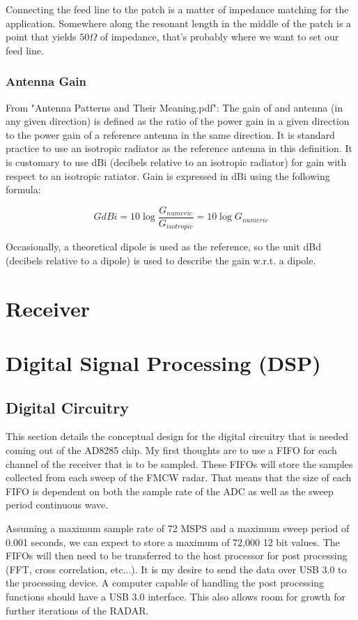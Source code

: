 \documentclass[]{article}
\begin{document}
Connecting the feed line to the patch is a matter of impedance matching for the application. Somewhere along the resonant length in the middle of the patch is a point that yields $ 50 \Omega $ of impedance, that's probably where we want to set our feed line.

\subsubsection{Antenna Gain}
From "Antenna Patterns and Their Meaning.pdf":
The gain of and antenna (in any given direction) is defined as the ratio of the power gain in a given direction to the power gain of a reference antenna in the same direction. It is standard practice to use an isotropic radiator as the reference antenna in this definition. It is customary to use dBi (decibels relative to an isotropic radiator) for gain with respect to an isotropic ratiator. Gain is expressed in dBi using the following formula:

\begin{equation}
GdBi = 10 \log{ \frac{G_{numeric}}{G_{isotropic}} } = 10 \log{ G_{numeric} }
\end{equation}

Occasionally, a theoretical dipole is used as the reference, so the unit dBd (decibels relative to a dipole) is used to describe the gain w.r.t. a dipole.

\section{Receiver}


\section{Digital Signal Processing (DSP)}

\subsection{Digital Circuitry}
This section details the conceptual design for the digital circuitry that is needed coming out of the AD8285 chip. My first thoughts are to use a FIFO for each channel of the receiver that is to be sampled. These FIFOs will store the samples collected from each sweep of the FMCW radar. That means that the size of each FIFO is dependent on both the sample rate of the ADC as well as the sweep period continuous wave.

Assuming a maximum sample rate of 72 MSPS and a maximum sweep period of 0.001 seconds, we can expect to store a maximum of 72,000 12 bit values. The FIFOs will then need to be transferred to the host processor for post processing (FFT, cross correlation, etc...). It is my desire to send the data over USB 3.0 to the processing device. A computer capable of handling the post processing functions should have a USB 3.0 interface. This also allows room for growth for further iterations of the RADAR.
\end{document}
